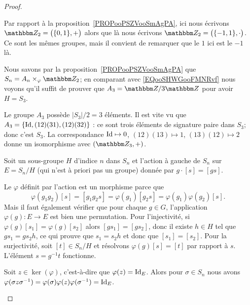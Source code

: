 \begin{proof}
\begin{subproof}
            Par rapport à la proposition~\ref{PROPooPSZVooSmAgPA}, ici nous écrivons \( \eZ_2=\big( \{ 0,1 \},+ \big)\) alors que là nous écrivons \( \eZ_2=\big( \{ -1,1 \},\cdot \big)\). Ce sont les mêmes groupes, mais il convient de remarquer que le \( 1\) ici est le \( -1\) là.

            Nous savons par la proposition~\ref{PROPooPSZVooSmAgPA} que \( S_n=A_n\times_{\varphi}\eZ_2\); en comparant avec \eqref{EQooSHWGooFMNRvf} nous voyons qu'il suffit de prouver que \( A_3=\eZ/3\eZ\) pour avoir \( H=S_3\).

            Le groupe \( A_3\) possède \( | S_3 |/2=3\) éléments. Il est vite vu que \( A_3=\{ \operatorname{Id},(12)(31), (12)(32) \}\) : ce sont trois éléments de signature paire dans \( S_3\); donc c'est \( S_3\). La correspondance \( \operatorname{Id}\mapsto 0\), \( (12)(13)\mapsto 1\), \( (13)(12)\mapsto 2\) donne un isomorphisme avec \( (\eZ_3,+)\).

        \item[Pour \( n\geq 5\)]

            Soit un sous-groupe \( H\) d'indice \( n\) dans \( S_n\) et l'action à gauche de \( S_n\) sur \( E=S_n/H\) (qui n'est à priori pas un groupe) donnée par \( g\cdot [s]=[gs]\).

            \begin{subproof}
                \item[Morphisme \( \varphi\colon S_n\to S_E\)]

                    Le \( \varphi\) définit par l'action est un morphisme parce que
                    \begin{equation}
                        \varphi(g_1g_2)[s]=[g_1g_2s]=\varphi(g_1)[g_2s]=\varphi(g_1)\varphi(g_2)[s].
                    \end{equation}
                    Mais il faut également vérifier que pour chaque \( g\in G\), l'application \( \varphi(g)\colon E\to E\) est bien une permutation. Pour l'injectivité, si \( \varphi(g)[s_1]=\varphi(g)[s_2]\) alors \( [gs_1]=[gs_2]\), donc il existe \( h\in H\) tel que \( gs_1=gs_2h\), ce qui prouve que \( s_1=s_2h\) et donc que \( [s_1]=[s_2]\). Pour la surjectivité, soit \( [t]\in S_n/H\) et résolvons \( \varphi(g)[s]=[t]\) par rapport à \( s\). L'élément \( s=g^{-1} t\) fonctionne.

                \item[\( \ker(\varphi)\) est normal]

                    Soit \( z\in\ker(\varphi)\), c'est-à-dire que \( \varphi(z)=\operatorname{Id}_E\). Alors pour \( \sigma\in S_n\) nous avons \( \varphi(\sigma z\sigma^{-1})=\varphi(\sigma)\varphi(z)\varphi(\sigma^{-1})=\operatorname{Id}_E\).


\end{subproof}
\end{subproof}
\end{proof}
